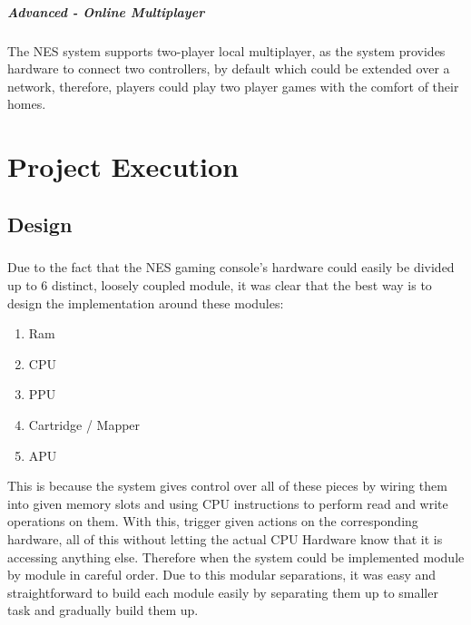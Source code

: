 \documentclass[]{report}
\begin{document}
\paragraph{Advanced - Online Multiplayer}
The NES system supports two-player local multiplayer, as the system provides hardware to connect two controllers, by default which could be extended over a network, therefore, players could play two player games with the comfort of their homes.

\chapter{Project Execution}

\section{Design}

\paragraph{ }
Due to the fact that the NES gaming console's hardware could easily be divided up to 6 distinct, loosely coupled module, it was clear that the best way is to design the implementation around these modules:
\begin{enumerate}
	\item Ram
	\item CPU
	\item PPU
	\item Cartridge / Mapper
	\item APU
\end{enumerate}

This is because the system gives control over all of these pieces by wiring them into given memory slots and using CPU instructions to perform read and write operations on them. With this, trigger given actions on the corresponding hardware, all of this without letting the actual CPU Hardware know that it is accessing anything else. Therefore when the system could be implemented module by module in careful order. Due to this modular separations, it was easy and straightforward to build each module easily by separating them up to smaller task and gradually build them up.
\end{document}
